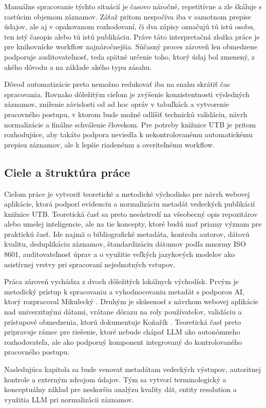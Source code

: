 Manuálne spracovanie týchto situácií je časovo náročné, repetitívne a zle škáluje s rastúcim objemom záznamov. Záťaž pritom nespočíva iba v samotnom prepise údajov, ale aj v opakovanom rozhodovaní, či dva zápisy označujú tú istú osobu, ten istý časopis alebo tú istú publikáciu. Práve táto interpretačná zložka práce je pre knihovnícke workflow najnáročnejšia. Súčasný proces zároveň len obmedzene podporuje auditovateľnosť, teda spätné určenie toho, ktorý údaj bol zmenený, z akého dôvodu a na základe akého typu zásahu.

Dôvod automatizácie preto nemožno redukovať iba na snahu skrátiť čas spracovania. Rovnako dôležitým cieľom je zvýšenie konzistentnosti výsledných záznamov, zníženie závislosti od ad hoc opráv v tabuľkách a vytvorenie pracovného postupu, v ktorom bude možné odlíšiť technickú validáciu, návrh normalizácie a finálne schválenie človekom. Pre potreby knižnice UTB je pritom rozhodujúce, aby takáto podpora neviedla k nekontrolovanému automatickému prepisu záznamov, ale k lepšie riadenému a overiteľnému workflow.

\subsection{Ciele a štruktúra práce}

Cieľom práce je vytvoriť teoretické a metodické východisko pre návrh webovej aplikácie, ktorá podporí evidenciu a normalizáciu metadát vedeckých publikácií knižnice UTB. Teoretická časť sa preto nesústredí na všeobecný opis repozitárov alebo umelej inteligencie, ale na tie koncepty, ktoré budú mať priamy význam pre praktickú časť. Ide najmä o bibliografické metadáta,  kontrolu autorov, dátovú kvalitu, deduplikáciu záznamov, štandardizáciu dátumov podľa mnormy ISO 8601, auditovateľnosť úprav a o využitie veľkých jazykových modelov ako asistívnej vrstvy pri spracovaní nejednotných vstupov.

Práca zároveň vychádza z dvoch dôležitých lokálnych východísk. Prvým je metodický prístup k spracovaniu a vyhodnocovaniu metadát s podporou AI, ktorý rozpracoval Mikulecký \cite{Mikulecky2025}. Druhým je skúsenosť s návrhom webovej aplikácie nad univerzitnými dátami, vrátane dôrazu na roly používateľov, validáciu a prístupové obmedzenia, ktorú dokumentuje Koňařík \cite{Konarik2025}. Teoretická časť preto pripravuje rámec pre riešenie, ktoré nebude chápať LLM ako autonómneho rozhodovateľa, ale ako podporný komponent integrovaný do kontrolovaného pracovného postupu.

Nasledujúca kapitola sa bude venovať metadátam vedeckých výstupov, autoritnej kontrole a externým zdrojom údajov. Tým sa vytvorí terminologický a konceptuálny základ pre neskoršiu analýzu kvality dát, entity resolution a využitia LLM pri normalizácii záznamov.
